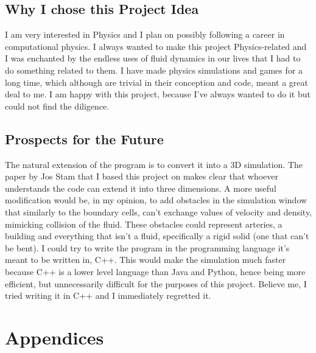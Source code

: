 \documentclass[12pt,a4paper]{book}
\begin{document}
\section{Why I chose this Project Idea}
I am very interested in Physics and I plan on possibly following a career in computational physics. I always wanted to make this project Physics-related and I was enchanted by the endless uses of fluid dynamics in our lives that I had to do something related to them. I have made physics simulations and games for a long time, which although are trivial in their conception and code, meant a great deal to me. I am happy with this project, because I've always wanted to do it but could not find the diligence.


\section{Prospects for the Future}
The natural extension of the program is to convert it into a 3D simulation. The paper by Jos Stam\cite{josrtfdg} that I based this project on makes clear that whoever understands the code can extend it into three dimensions. A more useful modification would be, in my opinion, to add obstacles in the simulation window that similarly to the boundary cells, can't exchange values of velocity and density, mimicking collision of the fluid. These obstacles could represent arteries, a building and everything that isn't a fluid, specifically a rigid solid (one that can't be bent). I could try to write the program in the programming language it's meant to be written in, C++. This would make the simulation much faster because C++ is a lower level language than Java and Python, hence being more efficient, but unnecessarily difficult for the purposes of this project. Believe me, I tried writing it in C++ and I immediately regretted it.



\chapter{Appendices}
\end{document}
